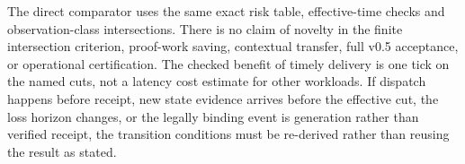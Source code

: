\documentclass[11pt]{article}
\begin{document}
The direct comparator uses the same exact risk table, effective-time checks and observation-class intersections. There is no claim of novelty in the finite intersection criterion, proof-work saving, contextual transfer, full v0.5 acceptance, or operational certification. The checked benefit of timely delivery is one tick on the named cuts, not a latency cost estimate for other workloads. If dispatch happens before receipt, new state evidence arrives before the effective cut, the loss horizon changes, or the legally binding event is generation rather than verified receipt, the transition conditions must be re-derived rather than reusing the result as stated.
\end{document}
